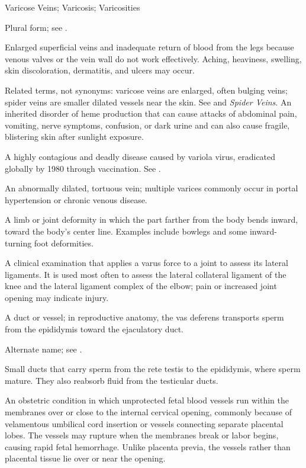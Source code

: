 \synonyms
Varicose Veins; Varicosis; Varicosities

 Plural form; see .

 Enlarged superficial veins and inadequate return of blood from the legs because venous valves or the vein wall do not work effectively. Aching, heaviness, swelling, skin discoloration, dermatitis, and ulcers may occur.

 Related terms, not synonyms: varicose veins are enlarged, often bulging veins; spider veins are smaller dilated vessels near the skin. See  and \textit{Spider Veins}.
 An inherited disorder of heme production that can cause attacks of abdominal pain, vomiting, nerve symptoms, confusion, or dark urine and can also cause fragile, blistering skin after sunlight exposure.

 A highly contagious and deadly disease caused by variola virus, eradicated globally by
1980 through vaccination. See .

 An abnormally dilated, tortuous vein; multiple varices commonly occur in portal hypertension or chronic venous disease.

 A limb or joint deformity in which the part farther from the body bends inward, toward the body’s center line. Examples include bowlegs and some inward-turning foot deformities.

 A clinical examination that applies a varus force to a joint to assess its lateral ligaments. It is used most often to assess the lateral collateral ligament of the knee and the lateral ligament complex of the elbow; pain or increased joint opening may indicate injury.

 A duct or vessel; in reproductive anatomy, the vas deferens transports sperm from the epididymis toward the ejaculatory duct.

 Alternate name; see .

 Small ducts that carry sperm from the rete testis to the epididymis, where sperm mature. They also reabsorb fluid from the testicular ducts.

 An obstetric condition in which unprotected fetal blood vessels
run within the membranes over or close to the internal cervical opening, commonly
because of velamentous umbilical cord insertion or vessels connecting separate
placental lobes. The vessels may rupture when the membranes break or labor begins,
causing rapid fetal hemorrhage. Unlike placenta previa, the vessels rather than
placental tissue lie over or near the opening.

